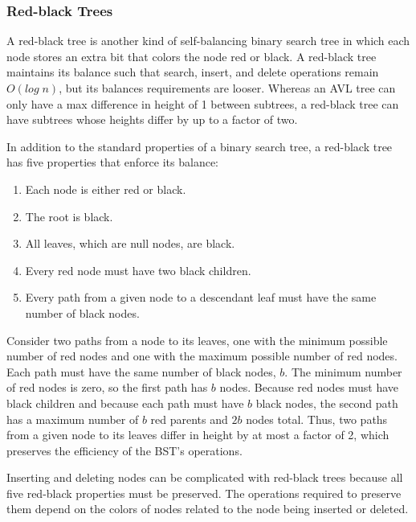 \subsubsection{Red-black Trees}

A red-black tree is another kind of self-balancing binary search tree in which each node stores an extra bit that colors the node red or black. A red-black tree maintains its balance such that search, insert, and delete operations remain $O(log\;n)$, but its balances requirements are looser. Whereas an AVL tree can only have a max difference in height of 1 between subtrees, a red-black tree can have subtrees whose heights differ by up to a factor of two.

In addition to the standard properties of a binary search tree, a red-black tree has five properties that enforce its balance:

\vspace{4mm}
\begin{enumerate}
   \item Each node is either red or black.
   \item The root is black.
   \item All leaves, which are null nodes, are black.
   \item Every red node must have two black children.
   \item Every path from a given node to a descendant leaf must have the same number of black nodes.
\end{enumerate}
\vspace{4mm}

Consider two paths from a node to its leaves, one with the minimum possible number of red nodes and one with the maximum possible number of red nodes. Each path must have the same number of black nodes, $b$. The minimum number of red nodes is zero, so the first path has $b$ nodes. Because red nodes must have black children and because each path must have $b$ black nodes, the second path has a maximum number of $b$ red parents and $2b$ nodes total. Thus, two paths from a given node to its leaves differ in height by at most a factor of 2, which preserves the efficiency of the BST's operations.

Inserting and deleting nodes can be complicated with red-black trees because all five red-black properties must be preserved. The operations required to preserve them depend on the colors of nodes related to the node being inserted or deleted.

